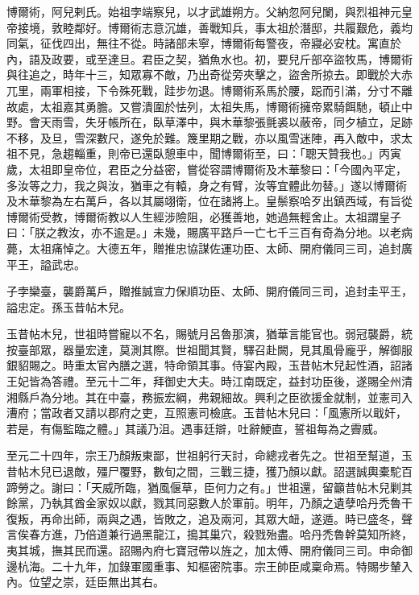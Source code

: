 \begin{pinyinscope}
 博爾術，阿兒剌氏。始祖孛端察兒，以才武雄朔方。父納忽阿兒闌，與烈祖神元皇帝接境，敦睦鄰好。博爾術志意沉雄，善戰知兵，事太祖於潛邸，共履艱危，義均同氣，征伐四出，無往不從。時諸部未寧，博爾術每警夜，帝寢必安枕。寓直於內，語及政要，或至達旦。君臣之契，猶魚水也。初，要兒斤部卒盜牧馬，博爾術與往追之，時年十三，知眾寡不敵，乃出奇從旁夾擊之，盜舍所掠去。即戰於大赤兀里，兩軍相接，下令殊死戰，跬步勿退。博爾術系馬於腰，跽而引滿，分寸不離故處，太祖嘉其勇膽。又嘗潰圍於怯列，太祖失馬，博爾術擁帝累騎餌馳，頓止中野。會天雨雪，失牙帳所在，臥草澤中，與木華黎張氈裘以蔽帝，同夕植立，足跡不移，及旦，雪深數尺，遂免於難。篾里期之戰，亦以風雪迷陣，再入敵中，求太祖不見，急趨輜重，則帝已還臥憩車中，聞博爾術至，曰：「聰天贊我也。」丙寅歲，太祖即皇帝位，君臣之分益密，嘗從容謂博爾術及木華黎曰：「今國內平定，多汝等之力，我之與汝，猶車之有轅，身之有臂，汝等宜體此勿替。」遂以博爾術及木華黎為左右萬戶，各以其屬翊衛，位在諸將上。皇鬃察哈歹出鎮西域，有旨從博爾術受教，博爾術教以人生經涉險阻，必獲善地，她過無輕舍止。太祖謂皇子曰：「朕之教汝，亦不逾是。」未幾，賜廣平路戶一亡七千三百有奇為分地。以老病薨，太祖痛悼之。大德五年，贈推忠協謀佐運功臣、太師、開府儀同三司，追封廣平王，謚武忠。



 子孛欒臺，襲爵萬戶，贈推誠宣力保順功臣、太師、開府儀同三司，追封圭平王，謚忠定。孫玉昔帖木兒。



 玉昔帖木兒，世祖時嘗寵以不名，賜號月呂魯那演，猶華言能官也。弱冠襲爵，統按臺部眾，器量宏達，莫測其際。世祖聞其賢，驛召赴闕，見其風骨龐乎，解御服銀貂賜之。時重太官內膳之選，特命領其事。侍宴內殿，玉昔帖木兒起性酒，詔諸王妃皆為答禮。至元十二年，拜御史大夫。時江南既定，益封功臣後，遂賜全州清湘縣戶為分地。其在中臺，務振宏綱，弗親細故。興利之臣欲援金就制，並憲司入漕府；當政者又請以郡府之吏，互照憲司檢底。玉昔帖木兒曰：「風憲所以戢奸，若是，有傷監臨之體。」其議乃沮。遇事廷辯，吐辭鯁直，誓祖每為之霽威。



 至元二十四年，宗王乃顏叛東鄙，世祖躬行天討，命總戎者先之。世祖至幫道，玉昔帖木兒已退敵，殭尸覆野，數旬之間，三戰三捷，獲乃顏以獻。詔選誠輿橐駝百蹄勞之。謝曰：「天威所臨，猶風偃草，臣何力之有。」世祖還，留籲昔帖木兒剿其餘黨，乃執其酋金家奴以獻，戮其同惡數人於軍前。明年，乃顏之遺孽哈丹禿魯干復叛，再命出師，兩與之遇，皆敗之，追及兩河，其眾大衄，遂遁。時已盛冬，聲言俟春方進，乃倍道兼行過黑龍江，搗其巢穴，殺戮殆盡。哈丹禿魯幹莫知所終，夷其城，撫其民而還。詔賜內府七寶冠帶以旌之，加太傅、開府儀同三司。申命御邊杭海。二十九年，加錄軍國重事、知樞密院事。宗王帥臣咸稟命焉。特賜步輦入內。位望之崇，廷臣無出其右。




\end{pinyinscope}
